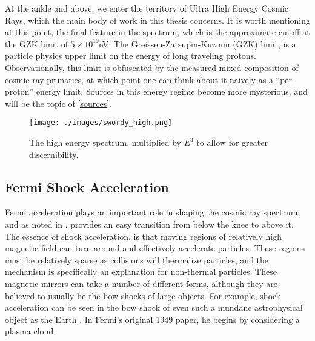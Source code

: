 At the ankle and above, we enter the territory of Ultra High Energy Cosmic Rays, which the main body of work in this thesis 
concerns. It is worth mentioning at this point, the final feature in the spectrum, which is the approximate cutoff at the GZK limit of $5\times10^{19}$eV. The Greissen-Zatsupin-Kuzmin (GZK) limit, is a particle physics upper limit on the energy of long traveling protons. Observationally, this limit is obfuscated by the measured mixed composition of cosmic ray primaries, at which point one can think about it naively as a ``per proton'' energy limit\cite{futuregzk}. Sources in this energy regime become more mysterious, and will be the topic of \autoref{sources}. 
\begin{figure}[h!]
\begin{center}
\texttt{[image: ./images/swordy\_high.png]}
\caption{The high energy spectrum, multiplied by $E^3$ to allow for greater discernibility.}
\label{swordyhigh}
\end{center}
\end{figure}
\subsection{Fermi Shock Acceleration}
\label{fermi}
Fermi acceleration plays an important role in shaping the cosmic ray spectrum, and as noted in \cite{crapp}, provides an easy transition from below the knee to above it. The essence of shock acceleration, is that moving regions of relatively high magnetic field can turn around and effectively accelerate particles. These regions must be relatively sparse as collisions will thermalize particles, and the mechanism is specifically an explanation for non-thermal particles. These magnetic mirrors can take a number of different forms, although they are believed to usually be the bow shocks of large objects. For example, shock acceleration can be seen in the bow shock of even such a mundane astrophysical object as the Earth \cite{shocks}. In Fermi's original 1949 paper, he begins by considering a plasma cloud.

